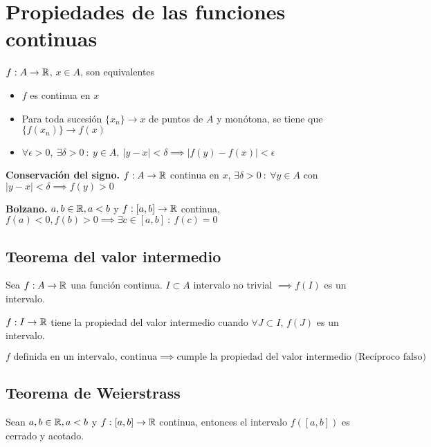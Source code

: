 \section{Propiedades de las funciones continuas}
$f:A\rightarrow\mathbb{R}$, $x\in A$, son equivalentes
\begin{itemize}
	\item $f$ es continua en $x$
	\item Para toda sucesión $\{x_n\}\rightarrow x$ de puntos de $A$ y monótona, se tiene que $\{f(x_n)\} \rightarrow f(x)$
	\item $ \forall\epsilon >0, \ \exists\delta >0 \ : \ y\in A, \ |y-x|<\delta \implies |f(y)-f(x)|<\epsilon $
\end{itemize}

\textbf{Conservación del signo.} $f:A\rightarrow\mathbb{R}$ continua en $x$, $\exists\delta>0 \ : \ \forall y\in A$ con $|y-x|<\delta\implies f(y)>0$

\textbf{Bolzano.} $a,b\in\mathbb{R},a<b$ y $f:[a,b]\rightarrow\mathbb{R}$ continua, $f(a)<0,f(b)>0\implies \exists c\in[a,b] \ : \ f(c)=0$

\subsection{Teorema del valor intermedio}
Sea $f:A\rightarrow\mathbb{R}$ una función continua. $I\subset A$ intervalo no trivial $\implies f(I)$ es un intervalo.

$f:I\rightarrow\mathbb{R}$ tiene la propiedad del valor intermedio cuando $\forall J\subset I$, $f(J)$ es un intervalo.

$f \text{ definida en un intervalo, continua} \implies \text{cumple la propiedad del valor intermedio (Recíproco falso)}$

\subsection{Teorema de Weierstrass}
Sean $a,b\in\mathbb{R}, a<b$ y $f:[a,b]\rightarrow\mathbb{R}$ continua, entonces el intervalo $f([a,b])$ es cerrado y acotado.